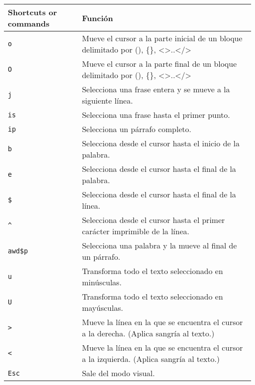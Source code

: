 \documentclass[
  doc,
  floatsintext,
  longtable,
  a4paper,
  nolmodern,
  notxfonts,
  notimes,
  colorlinks=true,linkcolor=blue,citecolor=blue,urlcolor=blue]{apa7}
\begin{document}
\begin{longtable}[]{@{}
  >{\raggedright\arraybackslash}p{}
  >{\raggedright\arraybackslash}p{}@{}}
\toprule\noalign{}
\begin{minipage}[b]{\linewidth}\raggedright
Shortcuts or commands
\end{minipage} & \begin{minipage}[b]{\linewidth}\raggedright
Función
\end{minipage} \\
\midrule\noalign{}
\endhead
\bottomrule\noalign{}
\endlastfoot
\texttt{o} & Mueve el cursor a la parte inicial de un bloque delimitado
por (), \{\}, \textless\textgreater..\textless/\textgreater{} \\
\texttt{O} & Mueve el cursor a la parte final de un bloque delimitado
por (), \{\}, \textless\textgreater..\textless/\textgreater{} \\
\texttt{j} & Selecciona una frase entera y se mueve a la siguiente
línea. \\
\texttt{is} & Selecciona una frase hasta el primer punto. \\
\texttt{ip} & Selecciona un párrafo completo. \\
\texttt{b} & Selecciona desde el cursor hasta el inicio de la
palabra. \\
\texttt{e} & Selecciona desde el cursor hasta el final de la palabra. \\
\texttt{\$} & Selecciona desde el cursor hasta el final de la línea. \\
\texttt{\^{}} & Selecciona desde el cursor hasta el primer carácter
imprimible de la línea. \\
\texttt{awd\$p} & Selecciona una palabra y la mueve al final de un
párrafo. \\
\texttt{u} & Transforma todo el texto seleccionado en minúsculas. \\
\texttt{U} & Transforma todo el texto seleccionado en mayúsculas. \\
\texttt{\textgreater{}} & Mueve la línea en la que se encuentra el
cursor a la derecha. (Aplica sangría al texto.) \\
\texttt{\textless{}} & Mueve la línea en la que se encuentra el cursor a
la izquierda. (Aplica sangría al texto.) \\
\texttt{Esc} & Sale del modo visual. \\
\end{longtable}
\end{document}
